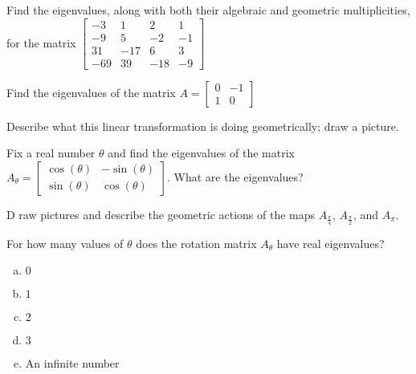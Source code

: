 \begin{applicationActivities}{4}{29}
\begin{activity}{0}
   Find the eigenvalues, along with both their algebraic and geometric multiplicities, for the matrix $\begin{bmatrix} -3 & 1 & 2 & 1 \\ -9 & 5 & -2 & -1 \\ 31 & -17 & 6 & 3 \\ -69 & 39 & -18 & -9 \end{bmatrix}$
\end{activity}

\begin{activity}{0}
  Find the eigenvalues of the matrix $A=\begin{bmatrix}0 & -1 \\ 1 & 0 \end{bmatrix}$
\end{activity}

\begin{activity}{0}
   Describe what this linear transformation is doing geometrically; draw a picture.
\end{activity}

\begin{activity}{0}
   Fix a real number $\theta$ and find the eigenvalues of the matrix $A_{\theta} = \begin{bmatrix} \cos(\theta) & -\sin(\theta) \\ \sin(\theta) & \cos (\theta) \end{bmatrix}$.  What are the eigenvalues?
\end{activity}

\begin{activity}{0} D
  raw pictures and describe the geometric actions of the maps $A_{\frac{\pi}{4
  }}$, $A_{\frac{\pi}{2}}$, and $A_{\pi}$.
\end{activity}

\begin{activity}{0}
  For how many values of $\theta$ does the rotation matrix $A_\theta$ have real eigenvalues?
\begin{enumerate}[(a)]
\item $0$
\item $1$
\item $2$
\item $3$
\item An infinite number
\end{enumerate}
\end{activity}

\end{applicationActivities}
